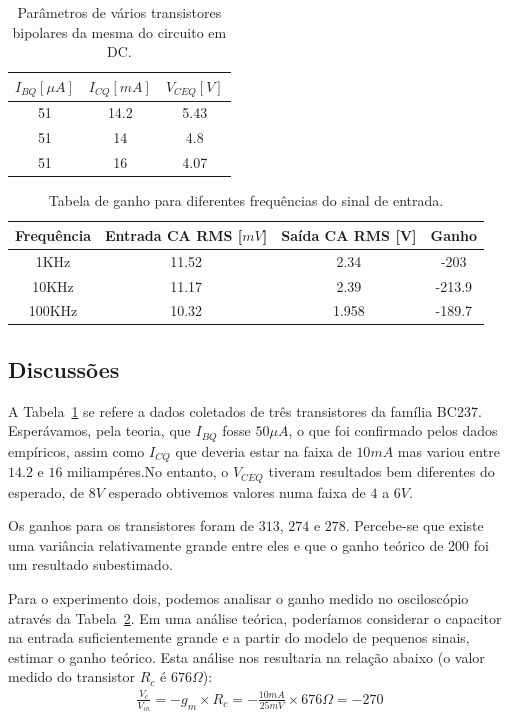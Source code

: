 \documentclass[12pt,a4paper]{article}
\begin{document}
\begin{table}[htpb]
  \centering
  \caption{Parâmetros de vários transistores bipolares da mesma do circuito em DC.}
  \label{tab:expdc}
  \begin{tabular}{c c c}
    \toprule
    $I_{BQ} [\mu A]$ & $I_{CQ}[mA]$ & $V_{CEQ}[V]$ \\ \midrule
    51               & 14.2         & 5.43         \\ \midrule
    51               & 14           & 4.8          \\ \midrule
    51               & 16           & 4.07         \\ \bottomrule
  \end{tabular}
\end{table}
\begin{table}[htpb]
  \centering
  \caption{Tabela de ganho para diferentes frequências do sinal de entrada.}
  \label{tab:osci}
  \begin{tabular}{c c c c}
    \toprule   
    Frequência  & Entrada  CA RMS [$mV$] & Saída CA RMS [V] & Ganho  \\ \midrule
    1KHz        & 11.52                  & 2.34             & -203   \\ \midrule
    10KHz       & 11.17                  & 2.39             & -213.9 \\ \midrule
    100KHz      & 10.32                  & 1.958            & -189.7 \\ \bottomrule
  \end{tabular}
\end{table}

\newpage
\subsection{Discussões}
A Tabela~\ref{tab:expdc} se refere a dados coletados de três transistores da família
BC237. Esperávamos, pela teoria, que $I_{BQ}$ fosse $50\mu A$, o que foi confirmado 
pelos dados empíricos, assim como $I_{CQ}$ que deveria estar na faixa de $10 mA$ 
mas variou entre $14.2$ e $16$ miliampéres.No entanto, o $V_{CEQ}$ tiveram resultados
bem diferentes do esperado, de $8V$ esperado obtivemos valores numa faixa de $4$ a $6V$.

Os ganhos para os transistores foram de $313$, $274$ e $278$. Percebe-se que existe 
uma variância relativamente grande entre eles e que o ganho teórico de 200 foi um 
resultado subestimado.


Para o experimento dois, podemos analisar o ganho medido no osciloscópio através da 
Tabela~\ref{tab:osci}. Em uma análise teórica, poderíamos considerar o capacitor na entrada
suficientemente grande e a partir do modelo de pequenos sinais, estimar o ganho teórico.
Esta análise nos resultaria na relação abaixo (o valor medido do transistor $R_{c}$ é $676\Omega$):
\begin{align*}
  \frac{V_{c}}{V_{in}}  = -g_{m} \times R_{c}=  -\frac{10mA}{25mV} \times 676 \Omega = -270
\end{align*}
\end{document}
